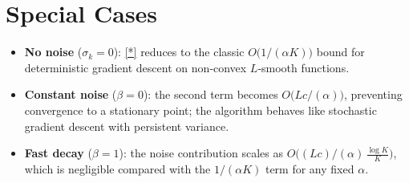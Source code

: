 \documentclass[11pt]{article}
\begin{document}
\section*{Special Cases}
\begin{itemize}
\item \textbf{No noise} ($\sigma_{k}=0$): \eqref{*} reduces to the classic $O\bigl(1/(\alpha K)\bigr)$ bound for deterministic gradient descent on non‑convex $L$‑smooth functions.
\item \textbf{Constant noise} ($\beta=0$): the second term becomes $O\!\bigl(Lc/(\alpha)\bigr)$, preventing convergence to a stationary point; the algorithm behaves like stochastic gradient descent with persistent variance.
\item \textbf{Fast decay} ($\beta=1$): the noise contribution scales as $O\!\bigl((L c)/(\alpha)\,\tfrac{\log K}{K}\bigr)$, which is negligible compared with the $1/(\alpha K)$ term for any fixed $\alpha$.
\end{itemize}
\end{document}
